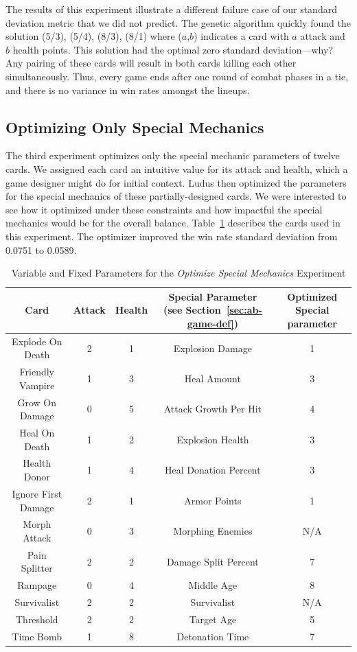 \documentclass[letterpaper]{article} %
\begin{document}
The results of this experiment illustrate a different failure case of our standard deviation metric that we did not predict. The genetic algorithm quickly found the solution (5/3), (5/4), (8/3), (8/1) where ($a$,$b$) indicates a card with $a$ attack and $b$ health points. This solution had the optimal zero standard deviation---why? Any pairing of these cards will result in both cards killing each other simultaneously. Thus, every game ends after one round of combat phases in a tie, and there is no variance in win rates amongst the lineups. 

 \subsection{Optimizing Only Special Mechanics}

The third experiment optimizes only the special mechanic parameters of twelve cards. We assigned each card an intuitive value for its attack and health, which a game designer might do for initial context. {\sc Ludus} then optimized the parameters for the special mechanics of these partially-designed cards. We were interested to see how it %
optimized under these constraints and how impactful the special mechanics would be for the overall balance. %
Table~\ref{tab:special_cards} describes the cards used in this experiment. The optimizer improved the win rate standard deviation from 0.0751 to 0.0589. 

\begin{table}[t]
\centering
\begin{tabular}{||c c c c c||} 
 \hline
 Card & Attack & Health & Special Parameter (see Section~\ref{sec:ab-game-def}) &  Optimized Special parameter\\ [0.5ex] 
 \hline\hline
 Explode On Death & 2 & 1 & Explosion Damage & 1\\ 
 \hline
 Friendly Vampire & 1 & 3 & Heal Amount & 3 \\
 \hline
 Grow On Damage & 0 & 5 & Attack Growth Per Hit & 4 \\
 \hline
 Heal On Death & 1 & 2 & Explosion Health & 3 \\
 \hline
 Health Donor & 1 & 4 & Heal Donation Percent & 3 \\
 \hline
 Ignore First Damage & 2 & 1 & Armor Points & 1 \\
 \hline
 Morph Attack & 0 & 3 & Morphing Enemies & N/A \\
 \hline
 Pain Splitter & 2 & 2 & Damage Split Percent & 7 \\
 \hline
 Rampage & 0 & 4 & Middle Age & 8 \\
 \hline
 Survivalist & 2 & 2 & Survivalist & N/A \\
 \hline
 Threshold & 2 & 2 & Target Age & 5 \\
 \hline
 Time Bomb & 1 & 8 & Detonation Time & 7 \\ 
 \hline
\end{tabular}
\caption{Variable and Fixed Parameters for the \textit{Optimize Special Mechanics} Experiment\label{tab:special_cards}}
\end{table}
\fi
\end{document}
